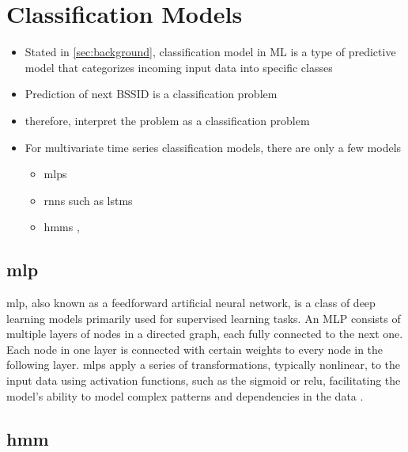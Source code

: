 \section{Classification Models}
\begin{itemize}
    \item Stated in \cref{sec:background}, classification model in ML is a type of predictive model that categorizes incoming input data into specific classes
    \item Prediction of next BSSID is a classification problem
    \item therefore, interpret the problem as a classification problem 
    \item For multivariate time series classification models, there are only a few models
    \begin{itemize}
        \item \acp{mlp} \cite{TSC}
        \item \acp{rnn} such as \acp{lstm}\cite{lstm-hochreiter}
        \item \acp{hmm} \cite{hmm-movement-prediction}, 
    \end{itemize}
\end{itemize}

\subsection{\ac{mlp}}


\ac{mlp}, also known as a feedforward artificial neural network, is a class of deep learning models primarily used for supervised learning tasks.
An MLP consists of multiple layers of nodes in a directed graph, each fully connected to the next one.
Each node in one layer is connected with certain weights to every node in the following layer.
\acp{mlp} apply a series of transformations, typically nonlinear, to the input data using activation functions, such as the sigmoid or \ac{relu}, facilitating the model's ability to model complex patterns and dependencies in the data \cite{goodfellow_deep_2016}.

\subsection{\ac{hmm}}

